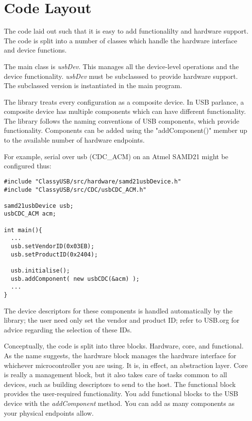 \chapter{Code Layout}

The code laid out such that it is easy to add functionalilty and hardware support. The code is split into a number of classes which handle the hardware interface and device functions.

The main class is \emph{usbDev}. This manages all the device-level operations and the device functionality. \emph{usbDev} must be subclasssed to provide hardware support. The subclassed version is instantiated in the main program.

The library treats every configuration as a composite device. In USB parlance, a composite device has multiple components which can have different functionality. The library follows the naming conventions of USB components, which provide functionality. Components can be added using the "addComponent()" member up to the available number of hardware endpoints.

For example, serial over usb (CDC\_ACM) on an Atmel SAMD21 might be configured thus:

\begin{verbatim}
#include "ClassyUSB/src/hardware/samd21usbDevice.h"
#include "ClassyUSB/src/CDC/usbCDC_ACM.h"

samd21usbDevice usb;
usbCDC_ACM acm;

int main(){
  ...
  usb.setVendorID(0x03EB);
  usb.setProductID(0x2404);

  usb.initialise();
  usb.addComponent( new usbCDC(&acm) );
  ...
}
\end{verbatim}

The device descriptors for these components is handled automatically by the library; the user need only set the vendor and product ID; refer to USB.org for advice regarding the selection of these IDs.

Conceptually, the code is split into three blocks. Hardware, core, and functional. As the name suggests, the hardware block manages the hardware interface for whichever microcontroller you are using. It is, in effect, an abstraction layer. Core is really a management block, but it also takes care of tasks common to all devices, such as building descriptors to send to the host. The functional block provides the user-required functionality. You add functional blocks to the USB device with the \emph{addComponent} method. You can add as many components as your physical endpoints allow.
